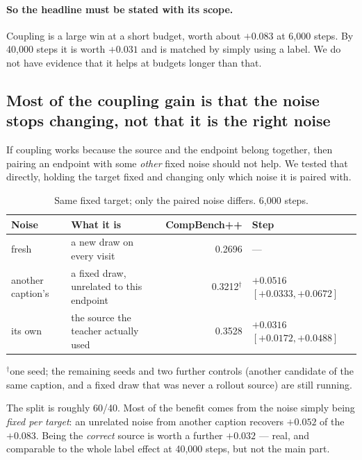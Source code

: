 \documentclass[11pt]{article}
\newcommand{\obs}[1]{\textcolor{obsblue}{#1}}
\begin{document}
\paragraph{So the headline must be stated with its scope.}
Coupling is a large win at a short budget, worth about \obs{$+0.083$} at \obs{6{,}000} steps. By
\obs{40{,}000} steps it is worth \obs{$+0.031$} and is matched by simply using a label. We do not
have evidence that it helps at budgets longer than that.

\subsection{Most of the coupling gain is that the noise stops changing, not that it is the right noise}

If coupling works because the source and the endpoint belong together, then pairing an endpoint with
some \emph{other} fixed noise should not help. We tested that directly, holding the target fixed and
changing only which noise it is paired with.

\begin{table}[h]
\centering
\caption{Same fixed target; only the paired noise differs. \obs{6{,}000} steps.}
\label{tab:noiseid}
\small
\begin{tabular}{@{}llrl@{}}
\toprule
Noise & What it is & CompBench++ & Step \\
\midrule
fresh & a new draw on every visit & \obs{0.2696} & --- \\
another caption's & a fixed draw, unrelated to this endpoint & \obs{0.3212}$^{\dagger}$ & \obs{$+0.0516$} $[+0.0333,+0.0672]$ \\
its own & the source the teacher actually used & \obs{0.3528} & \obs{$+0.0316$} $[+0.0172,+0.0488]$ \\
\bottomrule
\end{tabular}

\vspace{2pt}
{\footnotesize $^{\dagger}$one seed; the remaining seeds and two further controls
(another candidate of the same caption, and a fixed draw that was never a rollout source) are still
running.}
\end{table}

The split is roughly \obs{60}/\obs{40}. Most of the benefit comes from the noise simply being
\emph{fixed per target}: an unrelated noise from another caption recovers \obs{$+0.052$} of the
\obs{$+0.083$}. Being the \emph{correct} source is worth a further \obs{$+0.032$} --- real, and
comparable to the whole label effect at \obs{40{,}000} steps, but not the main part.
\end{document}
